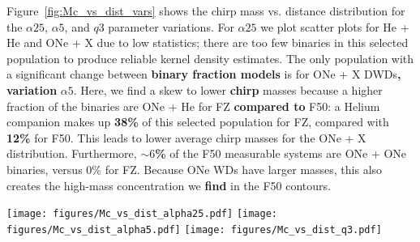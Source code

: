\documentclass[twocolumn, linenumbers]{aastex631}
\begin{document}
Figure~\ref{fig:Mc_vs_dist_vars} shows the chirp mass vs. distance distribution for the $\alpha25$, $\alpha5$, and $q3$ parameter variations. For $\alpha25$ we plot scatter plots for He + He and ONe + X due to low statistics; there are too few binaries in this selected population to produce reliable kernel density estimates. The only population with a significant change between \textbf{binary fraction models} is for ONe + X DWDs\textbf{, variation} $\alpha5$. Here, we find a skew to lower \textbf{chirp} masses because a higher fraction of the binaries are ONe + He for FZ \textbf{compared to} F50: a Helium companion makes up \textbf{38\%} of this selected population for FZ, compared with \textbf{12\%} for F50. This leads to lower average chirp masses for the ONe + X distribution. Furthermore, \textbf{$\sim6$\%} of the F50 measurable systems are ONe + ONe binaries, versus 0\% for FZ. Because ONe WDs have larger masses, this also creates the high-mass concentration we \textbf{find} in the F50 contours.
\begin{figure*}[h]
    \centering
	\texttt{[image: figures/Mc\_vs\_dist\_alpha25.pdf]}
	\texttt{[image: figures/Mc\_vs\_dist\_alpha5.pdf]}
	\texttt{[image: figures/Mc\_vs\_dist\_q3.pdf]}
    \caption{Chirp mass -- distance distributions for our other three binary evolution parameter variations. We plot the $\alpha25$ populations of He + He and ONe + X DWDs as scatter points since there are too few binaries to produce meaningful density distributions. Again, we have plotted each DWD type's population that exhibit observable GW frequency evolution and have $\rm{SNR}>7$. Contours show the 5$^{\rm{th}}$, 25$^{\rm{th}}$, 50$^{\rm{th}}$, 75$^{\rm{th}}$ and 95$^{\rm{th}}$ percentiles. Most populations remain unchanged between binary fraction models except for ONe + X DWDs in $\alpha5$, due to the number of He vs. CO vs. ONe companions between each model.}
    \label{fig:Mc_vs_dist_vars}
\end{figure*}
\end{document}
